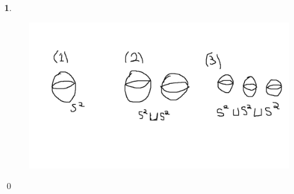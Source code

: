 \documentclass[10.5pt]{article}
\theoremstyle{definition}
\newtheorem{pb}{}
\begin{document}
    \begin{pb}
        \begin{figure}[h]
            \includegraphics[width=0.90\linewidth]{Nondiffeomorphic.png}
        \end{figure}
        \qed
    \end{pb}
\end{document}
